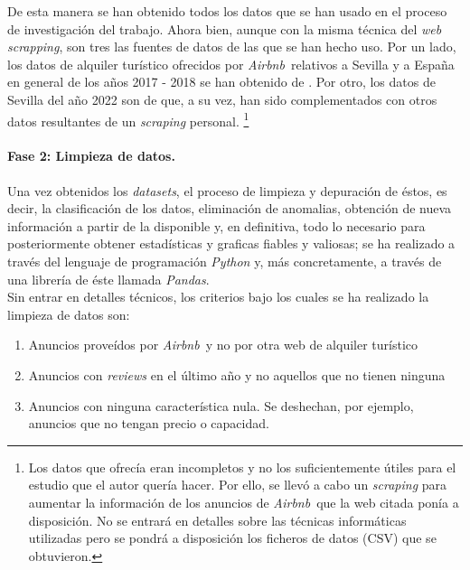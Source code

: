 \documentclass[a4paper,10pt]{article}
\newcommand*{\airbnb}{\textit{Airbnb}}
\newcommand*{\webscrapping}{\textit{web scrapping}}
\begin{document}
\begin{multicols}{2}
            \noindent
            De esta manera se han obtenido todos los datos que se han usado en el proceso de investigación del trabajo. Ahora bien, aunque con la misma técnica
            del \webscrapping, son tres las fuentes de datos de las que se han hecho uso. Por un lado, los datos de alquiler turístico ofrecidos por 
            \airbnb \  relativos a Sevilla y a España en general de los años 2017 - 2018 se han obtenido de \cite{datahippo}. Por otro, los datos 
            de Sevilla del año 2022 son de \cite{insideairbnb} que, a su vez, han sido complementados con otros datos resultantes de un \textit{scraping} personal.
            \footnote{Los datos que ofrecía \cite{insideairbnb} eran incompletos y no los suficientemente útiles para el estudio que el autor quería hacer. Por ello,
            se llevó a cabo un \textit{scraping} para aumentar la información de los anuncios de \airbnb \ que la web citada ponía a disposición. No se 
            entrará en detalles sobre las técnicas informáticas utilizadas pero se pondrá a disposición los ficheros de datos (CSV) que se obtuvieron.} 

            \paragraph*{\textbf{Fase 2: Limpieza de datos.}}
            Una vez obtenidos los \textit{datasets}, el proceso de limpieza y depuración de éstos, es decir, la clasificación de los datos, eliminación de 
            anomalias, obtención de nueva información a partir de la disponible y, en definitiva, todo lo necesario para posteriormente obtener estadísticas 
            y graficas fiables y valiosas; se ha realizado a través del lenguaje de programación \emph{Python} y, más concretamente, a través de una librería 
            de éste llamada \emph{Pandas}. \\
            Sin entrar en detalles técnicos, los criterios bajo los cuales se ha realizado la limpieza de datos son:

            \begin{enumerate}
                \item Anuncios proveídos por \airbnb \ y no por otra web de alquiler turístico
                \item Anuncios con \textit{reviews} en el último año y no aquellos que no tienen ninguna
                \item Anuncios con ninguna característica nula. Se deshechan, por ejemplo, anuncios que no tengan precio o capacidad.  
            \end{enumerate}


\end{multicols}
\end{document}
